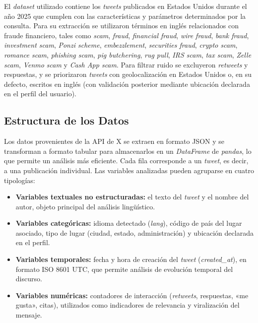 El \textit{dataset} utilizado contiene los \textit{tweets} publicados en Estados Unidos durante el año 2025 que cumplen con las características y parámetros determinados por la consulta. Para su extracción se utilizaron términos en inglés relacionados con fraude financiero, tales como \textit{scam}, \textit{fraud}, \textit{financial fraud}, \textit{wire fraud}, \textit{bank fraud}, \textit{investment scam}, \textit{Ponzi scheme}, \textit{embezzlement}, \textit{securities fraud}, \textit{crypto scam}, \textit{romance scam}, \textit{phishing scam}, \textit{pig butchering}, \textit{rug pull}, \textit{IRS scam}, \textit{tax scam}, \textit{Zelle scam}, \textit{Venmo scam} y \textit{Cash App scam}. Para filtrar ruido se excluyeron \textit{retweets} y respuestas, y se priorizaron \textit{tweets} con geolocalización en Estados Unidos o, en su defecto, escritos en inglés (con validación posterior mediante ubicación declarada en el perfil del usuario).

\subsection{Estructura de los Datos}

Los datos provenientes de la API de X se extraen en formato JSON y se transforman a formato tabular para almacenarlos en un \textit{DataFrame} de \textit{pandas}, lo que permite un análisis más eficiente. Cada fila corresponde a un \textit{tweet}, es decir, a una publicación individual. Las variables analizadas pueden agruparse en cuatro tipologías:

\begin{itemize}
    \item \textbf{Variables textuales no estructuradas:} el texto del \textit{tweet} y el nombre del autor, objeto principal del análisis lingüístico.
    \item \textbf{Variables categóricas:} idioma detectado (\textit{lang}), código de país del lugar asociado, tipo de lugar (ciudad, estado, administración) y ubicación declarada en el perfil.
    \item \textbf{Variables temporales:} fecha y hora de creación del \textit{tweet} (\textit{created\_at}), en formato ISO 8601 UTC, que permite análisis de evolución temporal del discurso.
    \item \textbf{Variables numéricas:} contadores de interacción (\textit{retweets}, respuestas, «me gusta», citas), utilizados como indicadores de relevancia y viralización del mensaje.
\end{itemize}

